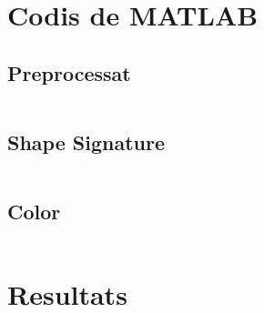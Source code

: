 
\section{Codis de MATLAB}

\subsection{Preprocessat}%
\label{app:pre}

\inputminted{matlab}{./code/preprocess.m}

\subsection{Shape Signature}%
\label{app:shapesig}
\inputminted{matlab}{./code/shapeSignature.m}

\pagebreak
\subsection{Color}%
\inputminted{matlab}{./code/splitColor.m}

\section{Resultats}%
\label{app:exemple}


